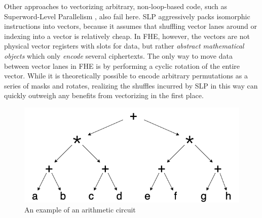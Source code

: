 
Other approaches to vectorizing arbitrary, non-loop-based code, such as Superword-Level Parallelism \cite{SLP}, also fail here.
SLP aggressively packs isomorphic instructions into vectors, because it assumes that shuffling vector lanes around or indexing into a vector is relatively cheap.
In FHE, however, the vectors are not physical vector registers with slots for data, but rather {\em abstract mathematical objects} which only {\em encode} several ciphertexts.
The only way to move data between vector lanes in FHE is by performing a cyclic rotation of the entire vector.
While it is theoretically possible to encode arbitrary permutations as a series of masks and rotates, realizing the shuffles incurred by SLP in this way can quickly outweigh any benefits from vectorizing in the first place.

\begin{figure}
    \includegraphics[width=0.6\linewidth]{figures/compilation_overview/coyote_running_example.drawio.png}
    \caption{An example of an arithmetic circuit}\label{fig:example-circuit}
\end{figure}

